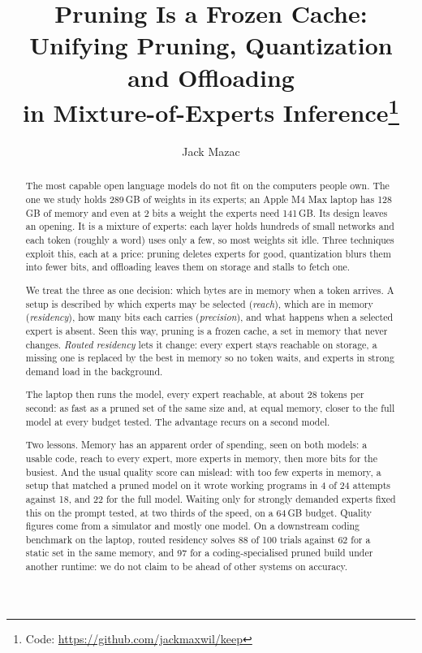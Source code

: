 \documentclass[11pt]{article}
\title{Pruning Is a Frozen Cache:\\Unifying Pruning, Quantization and Offloading\\in Mixture-of-Experts Inference\thanks{Code: \url{https://github.com/jackmaxwil/keep}}}
\author{Jack Mazac}
\date{}
\begin{document}
\maketitle

\begin{abstract}
The most capable open language models do not fit on the computers people own. The one we
study holds 289\,GB of weights in its experts; an Apple M4 Max laptop has 128\,GB
of memory and even at 2 bits a weight the experts need 141\,GB. Its design leaves an
opening. It is a mixture of experts: each layer holds hundreds of small networks
and each token (roughly a word) uses only a few, so most weights sit idle. Three techniques
exploit this, each at a price: pruning deletes experts for good, quantization blurs them
into fewer bits, and offloading leaves them on storage and stalls to fetch one.

We treat the three as one decision: which bytes are in memory when a token arrives. A setup is
described by which experts may be selected (\emph{reach}), which are in memory
(\emph{residency}), how many bits each carries (\emph{precision}), and what happens when a
selected expert is absent. Seen this way, pruning is a frozen cache, a set in memory that never
changes. \emph{Routed residency} lets it change: every expert stays reachable on storage, a
missing one is replaced by the best in memory so no token waits, and experts in strong demand
load in the background.

The laptop then runs the model, every expert reachable, at about 28 tokens per second:
as fast as a pruned set of the same size and, at equal memory, closer to the full model at
every budget tested. The advantage recurs on a second model.

Two lessons. Memory has an apparent order of spending, seen on both models: a usable code, reach to every
expert, more experts in memory, then more bits for the busiest. And the usual quality score can
mislead: with too few experts in memory, a setup that matched a pruned model on it wrote
working programs in 4 of 24 attempts against 18, and 22 for the full model. Waiting only for strongly demanded experts
fixed this on the prompt tested, at two thirds of the speed, on a 64\,GB budget. Quality
figures come from a simulator and mostly one model. On a downstream coding benchmark on the
laptop, routed residency solves 88 of 100 trials against 62 for a static set in the same memory,
and 97 for a coding-specialised pruned build under another runtime: we do not claim to be ahead
of other systems on accuracy.
\end{abstract}
\end{document}
